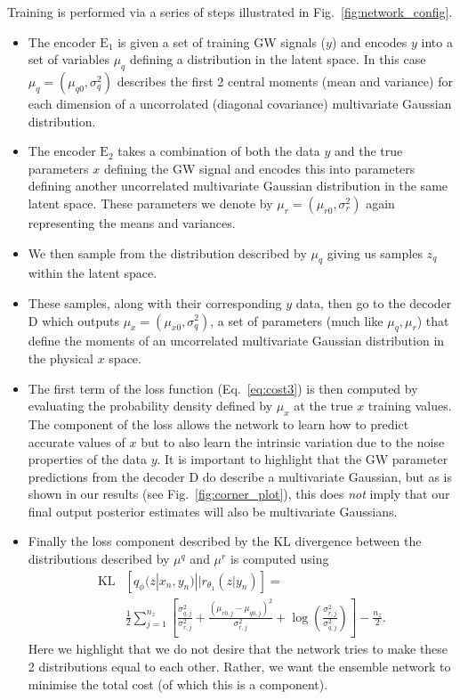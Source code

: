 \documentclass[%
showpacs,
 amsmath,amssymb,
 aps,
 twocolumn,
 prl,
 reprint,
floatfix,
]{revtex4-1}
\begin{document}
%
%
Training is performed via a series of steps illustrated in
Fig.~\ref{fig:network_config}.
%
\begin{itemize}
%
\item The encoder $\textrm{E}_1$ is given a set of training \ac{GW} signals
($y$) and encodes $y$ into a set of variables $\mu_q$ defining a distribution
in the latent space. In this case $\mu_q = (\mu_{q0},\sigma^{2}_{q})$ describes
the first 2 central moments (mean and variance) for each dimension of a
uncorrolated (diagonal covariance) multivariate Gaussian distribution.
%
\item The encoder $\textrm{E}_2$ takes a combination of both the data $y$ and
the true parameters $x$ defining the \ac{GW} signal and encodes this into
parameters defining another uncorrelated multivariate Gaussian distribution in
the same latent space. These parameters we denote by
$\mu_{r}=(\mu_{r0},\sigma^{2}_{r})$ again representing the means and variances.
%
\item We then sample from the distribution described by $\mu_{q}$ giving us
samples $z_{q}$ within the latent space.
%
\item These samples, along with their corresponding $y$ data, then go to the
decoder D which outputs $\mu_{x}=(\mu_{x0},\sigma^{2}_{q})$, a set of parameters (much like
$\mu_q,\mu_r$) that define the moments of an uncorrelated  multivariate Gaussian
distribution in the physical $x$ space.
\item The first term of the loss function (Eq.~\ref{eq:cost3}) is then computed
by evaluating the probability density defined by $\mu_x$ at the true $x$
training values. The component of the loss allows the network to learn how to
predict accurate values of $x$ but to also learn the intrinsic variation due to
the noise properties of the data $y$. It is important to highlight that the
\ac{GW} parameter predictions from the decoder D do describe a multivariate
Gaussian, but as is shown in our results (see Fig.~\ref{fig:corner_plot}), this
does \emph{not} imply that our final output posterior estimates will also be
multivariate Gaussians.
%
\item Finally the loss component described by the \ac{KL} divergence between the
distributions described by $\mu^{q}$ and $\mu^{r}$ is computed using
%
\begin{align}\label{eq:klgauss}
\text{KL}&\left[q_{\phi}(z|x_{n},y_{n})||r_{\theta_{1}}(z|y_{n})\right] = \\
&\frac{1}{2}\sum_{j=1}^{n_{z}}\left[\frac{\sigma_{q,j}^{2}}{\sigma_{r,j}^{2}} +
\frac{(\mu_{r0,j}-\mu_{q0,j})^{2}}{\sigma_{r,j}^{2}}+
\log\left(\frac{\sigma_{r,j}^{2}}{\sigma_{q,j}^{2}}\right)\right] -
\frac{n_{z}}{2}.\nonumber 
\end{align}
%
Here we highlight that we do not desire that the network tries to make these 2
distributions equal to each other. Rather, we want the ensemble network to
minimise the total cost (of which this is a component).
%
\end{itemize}
\end{document}
